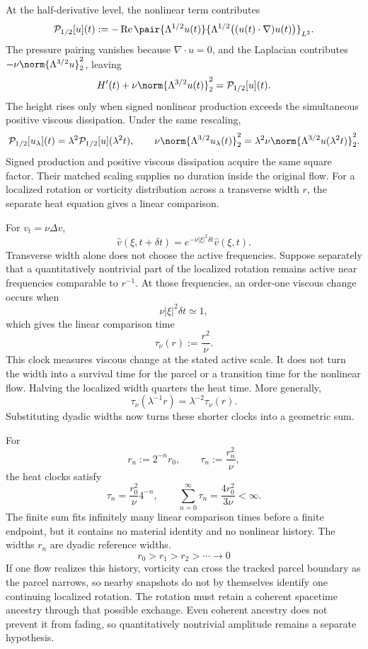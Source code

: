 
At the half-derivative level, the nonlinear term contributes
\[
  \mathcal P_{1/2}[u](t)
  :=
  -\operatorname{Re}
  \pair
    {\Lambda^{1/2}u(t)}
    {\Lambda^{1/2}\bigl((u(t)\cdot\nabla)u(t)\bigr)}_{L^2}.
\]
The pressure pairing vanishes because \(\nabla\cdot u=0\), and the Laplacian contributes \(-\nu\norm{\Lambda^{3/2}u}_2^2\), leaving
\[
  H'(t)
  +
  \nu\norm{\Lambda^{3/2}u(t)}_2^2
  =
  \mathcal P_{1/2}[u](t).
\]
The height rises only when signed nonlinear production exceeds the simultaneous positive viscous dissipation. Under the same rescaling,
\[
  \mathcal P_{1/2}[u_\lambda](t)
  =
  \lambda^2\mathcal P_{1/2}[u](\lambda^2t),
  \qquad
  \nu\norm{\Lambda^{3/2}u_\lambda(t)}_2^2
  =
  \lambda^2\nu\norm{\Lambda^{3/2}u(\lambda^2t)}_2^2.
\]
Signed production and positive viscous dissipation acquire the same square factor. Their matched scaling supplies no duration inside the original flow. For a localized rotation or vorticity distribution across a transverse width \(r\), the separate heat equation gives a linear comparison.


For \(v_t=\nu\Delta v\),
\[
  \widehat v(\xi,t+\delta t)
  =
  e^{-\nu|\xi|^2\delta t}\widehat v(\xi,t).
\]
Transverse width alone does not choose the active frequencies. Suppose separately that a quantitatively nontrivial part of the localized rotation remains active near frequencies comparable to \(r^{-1}\). At those frequencies, an order-one viscous change occurs when
\[
  \nu|\xi|^2\delta t\simeq1,
\]
which gives the linear comparison time
\[
  \tau_\nu(r)
  :=
  \frac{r^2}{\nu}.
\]
This clock measures viscous change at the stated active scale. It does not turn the width into a survival time for the parcel or a transition time for the nonlinear flow. Halving the localized width quarters the heat time. More generally,
\[
  \tau_\nu(\lambda^{-1}r)
  =
  \lambda^{-2}\tau_\nu(r).
\]
Substituting dyadic widths now turns these shorter clocks into a geometric sum.


For
\[
  r_n:=2^{-n}r_0,
  \qquad
  \tau_n:=\frac{r_n^2}{\nu},
\]
the heat clocks satisfy
\[
  \tau_n
  =
  \frac{r_0^2}{\nu}4^{-n},
  \qquad
  \sum_{n=0}^{\infty}\tau_n
  =
  \frac{4r_0^2}{3\nu}
  <
  \infty.
\]
The finite sum fits infinitely many linear comparison times before a finite endpoint, but it contains no material identity and no nonlinear history. The widths \(r_n\) are dyadic reference widths.
\[
  r_0>r_1>r_2>\cdots\longrightarrow0
\]
If one \NavierStokes{} flow realizes this history, vorticity can cross the tracked parcel boundary as the parcel narrows, so nearby snapshots do not by themselves identify one continuing localized rotation. The rotation must retain a coherent spacetime ancestry through that possible exchange. Even coherent ancestry does not prevent it from fading, so quantitatively nontrivial amplitude remains a separate hypothesis.

